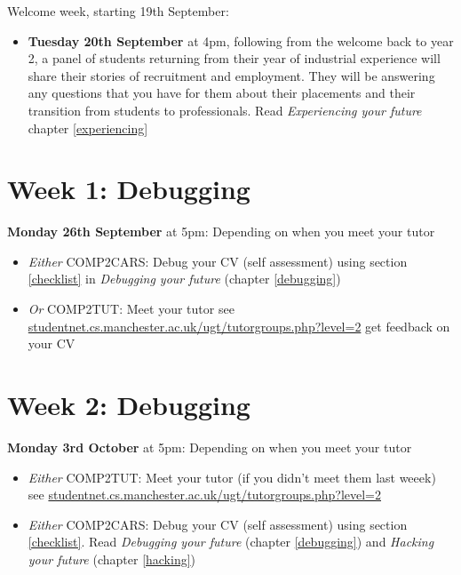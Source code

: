 \documentclass[
]{book}
\providecommand{\tightlist}{%
  \setlength{\itemsep}{0pt}\setlength{\parskip}{0pt}}
\begin{document}
Welcome week, starting 19th September:

\begin{itemize}
\tightlist
\item
  \textbf{Tuesday 20th September} at 4pm, following from the welcome back to year 2, a panel of students returning from their year of industrial experience will share their stories of recruitment and employment. They will be answering any questions that you have for them about their placements and their transition from students to professionals. Read \emph{Experiencing your future} chapter \ref{experiencing}
\end{itemize}

\hypertarget{week1}{%
\section{Week 1: Debugging}\label{week1}}

\textbf{Monday 26th September} at 5pm: Depending on when you meet your tutor

\begin{itemize}
\tightlist
\item
  \emph{Either} COMP2CARS: Debug your CV (self assessment) using section \ref{checklist} in \emph{Debugging your future} (chapter \ref{debugging})
\item
  \emph{Or} COMP2TUT: Meet your tutor see \href{http://studentnet.cs.manchester.ac.uk/ugt/tutorgroups.php?level=2}{studentnet.cs.manchester.ac.uk/ugt/tutorgroups.php?level=2} get feedback on your CV
\end{itemize}

\hypertarget{week2}{%
\section{Week 2: Debugging}\label{week2}}

\textbf{Monday 3rd October} at 5pm: Depending on when you meet your tutor

\begin{itemize}
\tightlist
\item
  \emph{Either} COMP2TUT: Meet your tutor (if you didn't meet them last weeek) see \href{http://studentnet.cs.manchester.ac.uk/ugt/tutorgroups.php?level=2}{studentnet.cs.manchester.ac.uk/ugt/tutorgroups.php?level=2}
\item
  \emph{Either} COMP2CARS: Debug your CV (self assessment) using section \ref{checklist}. Read \emph{Debugging your future} (chapter \ref{debugging}) and \emph{Hacking your future} (chapter \ref{hacking})
\end{itemize}
\end{document}
